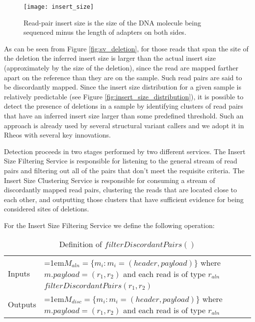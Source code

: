 \begin{figure}[H]
    \texttt{[image: insert\_size]}
    \centering
    \caption {Read-pair insert size is the size of the DNA molecule being sequenced minus the length of adapters on both sides\autocite{turner2014assessment}.}
    \label{fig:insert_size}
\end{figure}

As can be seen from Figure \ref{fig:sv_deletion}, for those reads that span the site of the deletion the inferred insert size is larger than the actual insert size (approximately by the size of the deletion), since the read are mapped farther apart on the reference than they are on the sample. Such read pairs are said to be discordantly mapped. Since the insert size distribution for a given sample is relatively predictable (see Figure \ref{fig:insert_size_distribution}), it is possible to detect the presence of deletions in a sample by identifying clusters of read pairs that have an inferred insert size larger than some predefined threshold. Such an approach is already used by several structural variant callers\autocites{rausch2012delly}{layer2014lumpy} and we adopt it in Rheos with several key innovations.

Detection proceeds in two stages performed by two different services. The Insert Size Filtering Service is responsible for listening to the general stream of read pairs and filtering out all of the pairs that don't meet the requisite criteria. The Insert Size Clustering Service is responsible for consuming a stream of discordantly mapped read pairs, clustering the reads that are located close to each other, and outputting those clusters that have sufficient evidence for being considered sites of deletions.

For the Insert Size Filtering Service we define the following operation:

\bgroup
\def\arraystretch{1.5}
\begin{table}[!ht]
    \caption{Definition of $filterDiscordantPairs()$}
    \label{tab:op_filter_discordant_pairs}
    {\begin{tabular}{l|p{12cm}}
    \toprule
    \multirow{2}{*}{Inputs} & \hangindent=1em$M_{aln} = \{m_i: m_i = (header, payload)\}$ where $m.payload = (r_1,r_2)$ and each read is of type $r_{aln}$\\
    \cline{2-2}
    \multirow{2}{*}{Operation} & $filterDiscordantPairs(r_1,r_2)$\\
     \cline{2-2}
    \multirow{2}{*}{Outputs} & \hangindent=1em$M_{disc} = \{m_i: m_i = (header, payload)\}$ where $m.payload = (r_1,r_2)$ and each read is of type $r_{aln}$\\
    \bottomrule
    \end{tabular}}
\end{table}
\egroup

